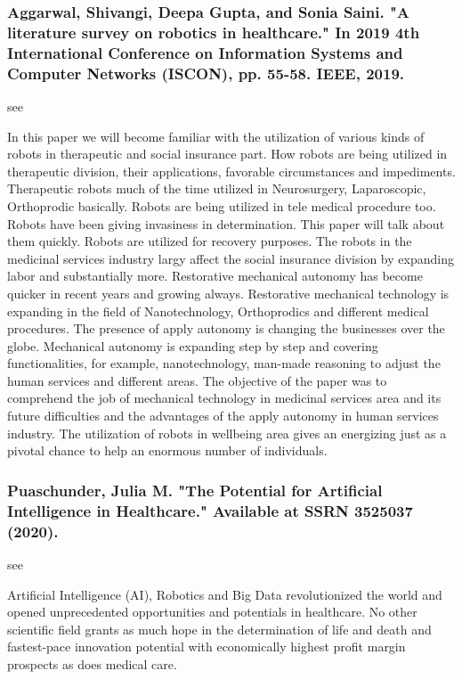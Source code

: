 \documentclass[conference]{IEEEtran}
\begin{document}
\medskip
\subsubsection{Aggarwal, Shivangi, Deepa Gupta, and Sonia Saini. "A literature survey on robotics in healthcare." In 2019 4th International Conference on Information Systems and Computer Networks (ISCON), pp. 55-58. IEEE, 2019.}
see \cite{aggarwal2019literature}

In this paper we will become familiar with the utilization of various kinds of robots in therapeutic and social insurance part. How robots are being utilized in therapeutic division, their applications, favorable circumstances and impediments. Therapeutic robots much of the time utilized in Neurosurgery, Laparoscopic, Orthoprodic basically. Robots are being utilized in tele medical procedure too. Robots have been giving invasiness in determination. This paper will talk about them quickly. Robots are utilized for recovery purposes. The robots in the medicinal services industry largy affect the social insurance division by expanding labor and substantially more. Restorative mechanical autonomy has become quicker in recent years and growing always. Restorative mechanical technology is expanding in the field of Nanotechnology, Orthoprodics and different medical procedures. The presence of apply autonomy is changing the businesses over the globe. Mechanical autonomy is expanding step by step and covering functionalities, for example, nanotechnology, man-made reasoning to adjust the human services and different areas. The objective of the paper was to comprehend the job of mechanical technology in medicinal services area and its future difficulties and the advantages of the apply autonomy in human services industry. The utilization of robots in wellbeing area gives an energizing just as a pivotal chance to help an enormous number of individuals.

\medskip
\subsubsection{Puaschunder, Julia M. "The Potential for Artificial Intelligence in Healthcare." Available at SSRN 3525037 (2020).}
see \cite{puaschunder2020potential}

Artificial Intelligence (AI), Robotics and Big Data revolutionized the world and opened unprecedented opportunities and potentials in healthcare. No other scientific field grants as much hope in the determination of life and death and fastest-pace innovation potential with economically highest profit margin prospects as does medical care.
\end{document}
